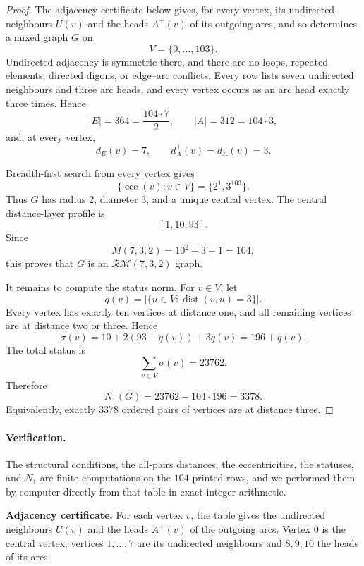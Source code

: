\documentclass[11pt]{amsart}
\theoremstyle{remark}
\newcommand{\RM}{\mathcal{RM}}
\newcommand{\dist}{\operatorname{dist}}
\newcommand{\ecc}{\operatorname{ecc}}
\begin{document}
\begin{proof}
The adjacency certificate below gives, for every vertex, its undirected
neighbours $U(v)$ and the heads $A^+(v)$ of its outgoing arcs, and so
determines a mixed graph $G$ on
\[
V=\{0,\ldots,103\}.
\]
Undirected adjacency is symmetric there, and there are no loops,
repeated elements, directed digons, or edge--arc conflicts. Every row
lists seven undirected neighbours and three arc heads, and every vertex
occurs as an arc head exactly three times. Hence
\[
|E|=364=\frac{104\cdot7}{2},
\qquad
|A|=312=104\cdot3,
\]
and, at every vertex,
\[
d_E(v)=7,
\qquad
d_A^+(v)=d_A^-(v)=3.
\]

Breadth-first search from every vertex gives
\[
\{\ecc(v):v\in V\}=\{2^1,3^{103}\}.
\]
Thus $G$ has radius $2$, diameter $3$, and a unique central vertex.
The central distance-layer profile is
\[
[1,10,93].
\]
Since
\[
M(7,3,2)=10^2+3+1=104,
\]
this proves that $G$ is an $\RM(7,3,2)$ graph.

It remains to compute the status norm. For $v\in V$, let
\[
q(v)=|\{u\in V:\dist(v,u)=3\}|.
\]
Every vertex has exactly ten vertices at distance one, and all
remaining vertices are at distance two or three. Hence
\[
\sigma(v)
 =10+2(93-q(v))+3q(v)
 =196+q(v).
\]
The total status is
\[
\sum_{v\in V}\sigma(v)=23762.
\]
Therefore
\[
N_1(G)
 =23762-104\cdot196
 =3378.
\]
Equivalently, exactly $3378$ ordered pairs of vertices are at distance
three.
\end{proof}

\paragraph{Verification.}
The structural conditions, the all-pairs distances, the eccentricities,
the statuses, and $N_1$ are finite computations on the $104$ printed
rows, and we performed them by computer directly from that table in
exact integer arithmetic.

\medskip
\noindent\textbf{Adjacency certificate.}
For each vertex $v$, the table gives the undirected neighbours $U(v)$
and the heads $A^+(v)$ of the outgoing arcs. Vertex $0$ is the central
vertex; vertices $1,\ldots,7$ are its undirected neighbours and
$8,9,10$ the heads of its arcs.
\end{document}
